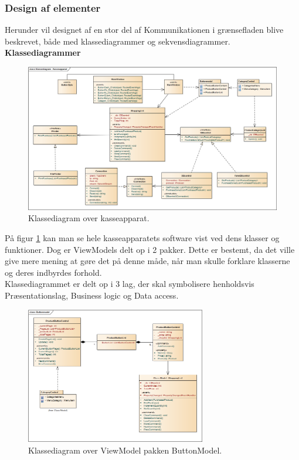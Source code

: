 \subsubsection{Design af elementer}
Herunder vil designet af en stor del af Kommunikationen i grænsefladen blive beskrevet, både med klassediagrammer og sekvensdiagrammer.\\

\textbf{Klassediagrammer}\\

\begin{figure}[H]
	\centering
	\includegraphics[width=1.2\textwidth, angle=90]{Systemdesign/Frontend/GUI/DesignOgStruktur/Pics/KlassediagramKasseApparat}
	\caption{Klassediagram over kasseapparat.}
	\label{fig:KasseKlasse}
\end{figure}

På figur \ref{fig:KasseKlasse} kan man se hele kasseapparatets software vist ved dens klasser og funktioner. Dog er ViewModels delt op i 2 pakker. Dette er bestemt, da det ville give mere mening at gøre det på denne måde, når man skulle forklare klasserne og deres indbyrdes forhold. \\
Klassediagrammet er delt op i 3 lag, der skal symbolisere henholdsvis Præsentationslag, Business logic og Data access.

\begin{figure}[H]
	\centering
	\includegraphics[width=0.7\textwidth]{Systemdesign/Frontend/GUI/DesignOgStruktur/Pics/KlassediagramButtonModel}
	\caption{Klassediagram over ViewModel pakken ButtonModel.}
	\label{fig:ButtonModel}
\end{figure}

